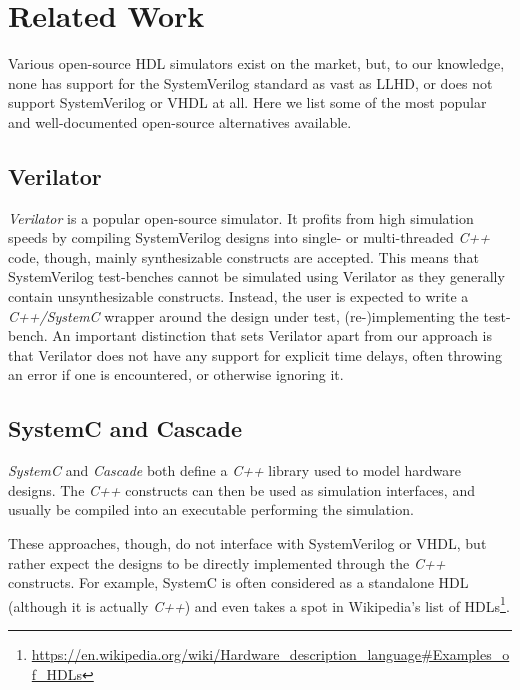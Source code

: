 \chapter{Related Work}
Various open-source HDL simulators exist on the market, but, to our knowledge, none has support for the SystemVerilog standard as vast as LLHD, or does not support SystemVerilog or VHDL at all. Here we list some of the most popular and well-documented open-source alternatives available.


\section{Verilator}
\textit{Verilator} \cite{verilator} is a popular open-source simulator. It profits from high simulation speeds by compiling SystemVerilog designs into single- or multi-threaded \textit{C++} code, though, mainly synthesizable constructs are accepted. This means that SystemVerilog test-benches cannot be simulated using Verilator as they generally contain unsynthesizable constructs. Instead, the user is expected to write a \textit{C++/SystemC} wrapper around the design under test, (re-)implementing the test-bench. An important distinction that sets Verilator apart from our approach is that Verilator does not have any support for explicit time delays, often throwing an error if one is encountered, or otherwise ignoring it.


\section{SystemC and Cascade}
\textit{SystemC} \cite{systemc} and \textit{Cascade} \cite{Grossman2013}  both define a \textit{C++} library used to model hardware designs. The \textit{C++} constructs can then be used as simulation interfaces, and usually be compiled into an executable performing the simulation.

These approaches, though, do not interface with SystemVerilog or VHDL, but rather expect the designs to be directly implemented through the \textit{C++} constructs. For example, SystemC is often considered as a standalone HDL (although it is actually \textit{C++}) and even takes a spot in Wikipedia's list of HDLs\footnote{\url{https://en.wikipedia.org/wiki/Hardware_description_language\#Examples_of_HDLs}}.

